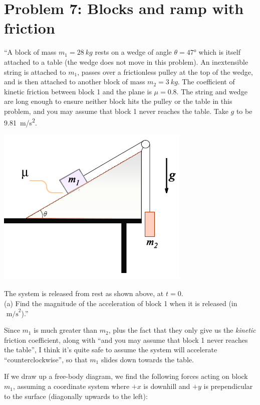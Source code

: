 \documentclass[12pt,a4paper]{report}
\begin{document}
\section{Problem 7: Blocks and ramp with friction}

``A block of mass $m_1 = \SI{28}{kg}$ rests on a wedge of angle $\theta = \ang{47}$ which is itself attached to a table (the wedge does not move in this problem). An inextensible string is attached to $m_1$, passes over a frictionless pulley at the top of the wedge, and is then attached to another block of mass $m_2 = \SI{3}{kg}$. The coefficient of kinetic friction between block 1 and the plane is $\mu = 0.8$. The string and wedge are long enough to ensure neither block hits the pulley or the table in this problem, and you may assume that block 1 never reaches the table. Take $g$ to be \SI{9.81}{m/s^2}.

\begin{center}
\includegraphics[scale=0.7]{Graphics/h3p7}
\end{center}

The system is released from rest as shown above, at $t = 0$.\\
(a) Find the magnitude of the acceleration of block 1 when it is released (in $\text{ m/s}^2$).''

Since $m_1$ is much greater than $m_2$, plus the fact that they only give us the \emph{kinetic} friction coefficient, along with ``and you may assume that block 1 never reaches the table'', I think it's quite safe to assume the system will accelerate ``counterclockwise'', so that $m_1$ slides down towards the table.

If we draw up a free-body diagram, we find the following forces acting on block $m_1$, assuming a coordinate system where $+x$ is downhill and $+y$ is prependicular to the surface (diagonally upwards to the left):
\end{document}

